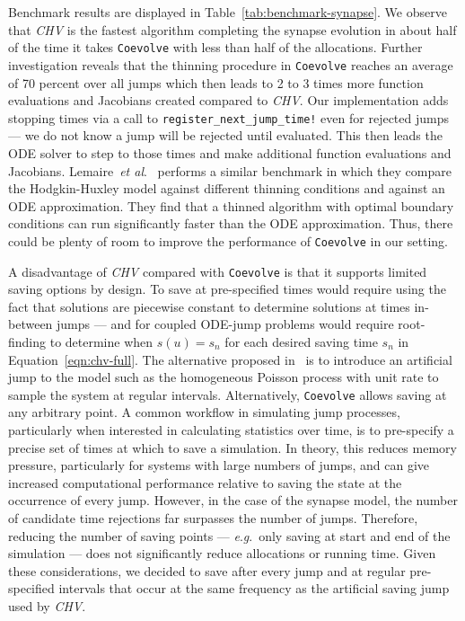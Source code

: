 \documentclass{juliacon}
\numberwithin{equation}{section}
\newcommand{\etal}{\textit{et al}.}
\newcommand{\eg}{\textit{e}.\textit{g}.}
\begin{document}
Benchmark results are displayed in Table~\ref{tab:benchmark-synapse}. We observe that \textit{CHV} is the fastest algorithm completing the synapse evolution in about half of the time it takes \texttt{Coevolve} with less than half of the allocations. Further investigation reveals that the thinning procedure in \texttt{Coevolve} reaches an average of 70 percent over all jumps which then leads to 2 to 3 times more function evaluations and Jacobians created compared to \textit{CHV}. Our implementation adds stopping times via a call to \texttt{register\_next\_jump\_time!} even for rejected jumps --- we do not know a jump will be rejected until evaluated. This then leads the ODE solver to step to those times and make additional function evaluations and Jacobians. Lemaire~\etal~\cite{lemaire2018} performs a similar benchmark in which they compare the Hodgkin-Huxley model against different thinning conditions and against an ODE approximation. They find that a thinned algorithm with optimal boundary conditions can run significantly faster than the ODE approximation. Thus, there could be plenty of room to improve the performance of \texttt{Coevolve} in our setting.

A disadvantage of \textit{CHV} compared with \texttt{Coevolve} is that it supports limited saving options by design. To save at pre-specified times would require using the fact that solutions are piecewise constant to determine solutions at times in-between jumps --- and for coupled ODE-jump problems would require root-finding to determine when \( s(u) = s_n \) for each desired saving time \( s_n \) in Equation~\ref{eqn:chv-full}. The alternative proposed in~\cite{veltz2015} is to introduce an artificial jump to the model such as the homogeneous Poisson process with unit rate to sample the system at regular intervals. Alternatively, \texttt{Coevolve} allows saving at any arbitrary point. A common workflow in simulating jump processes, particularly when interested in calculating statistics over time, is to pre-specify a precise set of times at which to save a simulation. In theory, this reduces memory pressure, particularly for systems with large numbers of jumps, and can give increased computational performance relative to saving the state at the occurrence of every jump. However, in the case of the synapse model, the number of candidate time rejections far surpasses the number of jumps. Therefore, reducing the number of saving points --- \eg~only saving at start and end of the simulation --- does not significantly reduce allocations or running time. Given these considerations, we decided to save after every jump and at regular pre-specified intervals that occur at the same frequency as the artificial saving jump used by \textit{CHV}.
\end{document}
